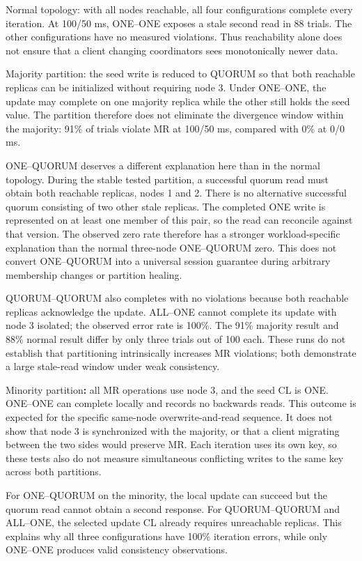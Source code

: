 Normal topology: with all nodes reachable, all four configurations complete every iteration. At 100/50 ms, ONE--ONE exposes a stale second read in 88 trials. The other configurations have no measured violations. Thus reachability alone does not ensure that a client changing coordinators sees monotonically newer data.

Majority partition: the seed write is reduced to QUORUM so that both reachable replicas can be initialized without requiring node 3. Under ONE--ONE, the update may complete on one majority replica while the other still holds the seed value. The partition therefore does not eliminate the divergence window within the majority: 91\% of trials violate MR at 100/50 ms, compared with 0\% at 0/0 ms.

ONE--QUORUM deserves a different explanation here than in the normal topology. During the stable tested partition, a successful quorum read must obtain both reachable replicas, nodes 1 and 2. There is no alternative successful quorum consisting of two other stale replicas. The completed ONE write is represented on at least one member of this pair, so the read can reconcile against that version. The observed zero rate therefore has a stronger workload-specific explanation than the normal three-node ONE--QUORUM zero. This does not convert ONE--QUORUM into a universal session guarantee during arbitrary membership changes or partition healing.

QUORUM--QUORUM also completes with no violations because both reachable replicas acknowledge the update. ALL--ONE cannot complete its update with node 3 isolated; the observed error rate is 100\%. The 91\% majority result and 88\% normal result differ by only three trials out of 100 each. These runs do not establish that partitioning intrinsically increases MR violations; both demonstrate a large stale-read window under weak consistency.

Minority partition\textbf{:} all MR operations use node 3, and the seed CL is ONE. ONE--ONE can complete locally and records no backwards reads. This outcome is expected for the specific same-node overwrite-and-read sequence. It does not show that node 3 is synchronized with the majority, or that a client migrating between the two sides would preserve MR. Each iteration uses its own key, so these tests also do not measure simultaneous conflicting writes to the same key across both partitions.

For ONE--QUORUM on the minority, the local update can succeed but the quorum read cannot obtain a second response. For QUORUM--QUORUM and ALL--ONE, the selected update CL already requires unreachable replicas. This explains why all three configurations have 100\% iteration errors, while only ONE--ONE produces valid consistency observations.

